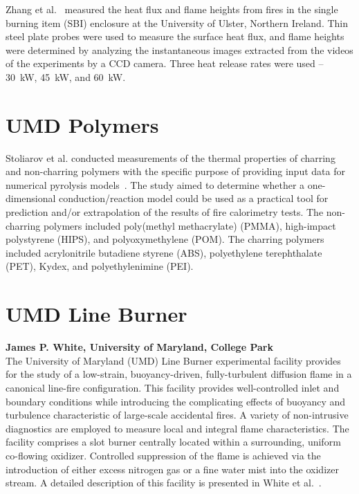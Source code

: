 Zhang et al.~\cite{Zhang:IAFSS9} measured the heat flux and flame heights from fires in the single burning item (SBI) enclosure at the University of Ulster, Northern Ireland. Thin steel plate probes were used to measure the surface heat flux, and flame heights were determined by analyzing the instantaneous images extracted from the videos of the experiments by a CCD camera. Three heat release rates were used -- 30~kW, 45~kW, and 60~kW.


\section{UMD Polymers}
\label{UMD_Polymers_Description}

Stoliarov et al. conducted measurements of the thermal properties of charring and non-charring polymers with the specific purpose of providing input data for numerical pyrolysis models~\cite{Li:IJHMT,Li:CF,Li:PDS_2014,Li:PDS_2015}. The study aimed to determine whether a one-dimensional conduction/reaction model could be used as a practical tool for prediction and/or extrapolation of the results of fire calorimetry tests. The non-charring polymers included poly(methyl methacrylate) (PMMA), high-impact polystyrene (HIPS), and polyoxymethylene (POM). The charring polymers included acrylonitrile butadiene styrene (ABS), polyethylene terephthalate (PET), Kydex, and polyethylenimine (PEI).


\section{UMD Line Burner}
\label{UMD_Line_Burner_Description}

{\bf James P. White, University of Maryland, College Park}\\

\noindent The University of Maryland (UMD) Line Burner experimental facility provides for the study of a low-strain, buoyancy-driven, fully-turbulent diffusion flame in a canonical line-fire configuration. This facility provides well-controlled inlet and boundary conditions while introducing the complicating effects of buoyancy and turbulence characteristic of large-scale accidental fires. A variety of non-intrusive diagnostics are employed to measure local and integral flame characteristics. The facility comprises a slot burner centrally located within a surrounding, uniform co-flowing oxidizer. Controlled suppression of the flame is achieved via the introduction of either excess nitrogen gas or a fine water mist into the oxidizer stream. A detailed description of this facility is presented in White et al.~\cite{White:2015}.

